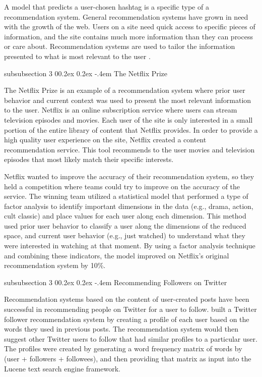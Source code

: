 \documentclass[man,floatsintext,donotrepeattitle]{apa6}
\makeatletter
\renewcommand{\subsubsection}{%
  \@startsection
  {subsubsection}%
  {3}%
  {\parindent}%
  {0\baselineskip \@plus 0.2ex \@minus 0.2ex}%
  {-.4em}%
  {\normalfont\normalsize\bfseries\addperi}}
\makeatother
\begin{document}
A model that predicts a user-chosen hashtag is a specific type of a recommendation system.
General recommendation systems have grown in need with the growth of the web.
Users on a site need quick access to specific pieces of information, and the site contains much more information than they can process or care about.
Recommendation systems are used to tailor the information presented to what is most relevant to the user \parencite{Pazzani2007}.

\subsubsection{The Netflix Prize}

The Netflix Prize \parencite{Bennett2007} is an example of a recommendation system where prior user behavior and current context was used to present the most relevant information to the user.
Netflix is an online subscription service where users can stream television episodes and movies.
Each user of the site is only interested in a small portion of the entire library of content that Netflix provides.
In order to provide a high quality user experience on the site, Netflix created a content recommendation service.
This tool recommends to the user movies and television episodes that most likely match their specific interests.

Netflix wanted to improve the accuracy of their recommendation system, so they held a competition where teams could try to improve on the accuracy of the service.
The winning team utilized a statistical model that performed a type of factor analysis to identify important dimensions in the data (e.g., drama, action, cult classic) and place values for each user along each dimension. 
This method used prior user behavior to classify a user along the dimensions of the reduced space, and current user behavior (e.g., just watched) to understand what they were interested in watching at that moment.
By using a factor analysis technique and combining these indicators, the model improved on Netflix's original recommendation system by 10\%.

\subsubsection{Recommending Followers on Twitter}

Recommendation systems based on the content of user-created posts have been successful in recommending people on Twitter for a user to follow.
\textcite{Hannon2010} built a Twitter follower recommendation system by creating a profile of each user based on the words they used in previous posts.
The recommendation system would then suggest other Twitter users to follow that had similar profiles to a particular user.
The profiles were created by generating a word frequency matrix of words by (user + followers + followees), and then providing that matrix as input into the Lucene text search engine framework.
\end{document}
